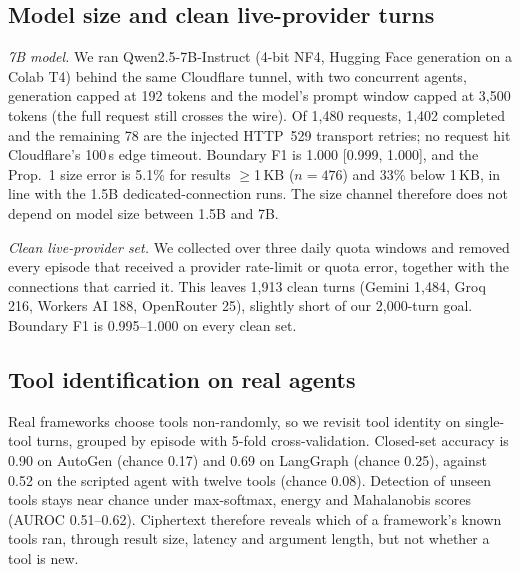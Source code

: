 \subsection{Model size and clean live-provider turns}
\emph{7B model.} We ran Qwen2.5-7B-Instruct (4-bit NF4, Hugging Face generation on a Colab T4) behind the same Cloudflare tunnel, with two concurrent agents, generation capped at 192 tokens and the model's prompt window capped at 3,500 tokens (the full request still crosses the wire). Of 1,480 requests, 1,402 completed and the remaining 78 are the injected HTTP~529 transport retries; no request hit Cloudflare's 100\,s edge timeout. Boundary F1 is 1.000 [0.999, 1.000], and the Prop.~1 size error is 5.1\% for results $\geq$1\,KB ($n{=}476$) and 33\% below 1\,KB, in line with the 1.5B dedicated-connection runs. The size channel therefore does not depend on model size between 1.5B and 7B.

\emph{Clean live-provider set.} We collected over three daily quota windows and removed every episode that received a provider rate-limit or quota error, together with the connections that carried it. This leaves 1,913 clean turns (Gemini 1,484, Groq 216, Workers AI 188, OpenRouter 25), slightly short of our 2,000-turn goal. Boundary F1 is 0.995--1.000 on every clean set.

\subsection{Tool identification on real agents}
Real frameworks choose tools non-randomly, so we revisit tool identity on single-tool turns, grouped by episode with 5-fold cross-validation. Closed-set accuracy is 0.90 on AutoGen (chance 0.17) and 0.69 on LangGraph (chance 0.25), against 0.52 on the scripted agent with twelve tools (chance 0.08). Detection of unseen tools stays near chance under max-softmax, energy and Mahalanobis scores (AUROC 0.51--0.62). Ciphertext therefore reveals which of a framework's known tools ran, through result size, latency and argument length, but not whether a tool is new.

